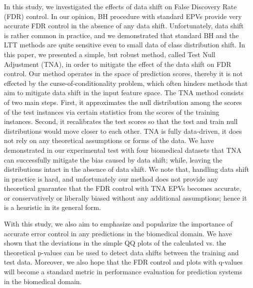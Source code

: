 \documentclass{article}
\newcommand{\todo}[2]{{\color{red} {\bf TODO-#1}: #2}}
\begin{document}
In this study, we investigated the effects of data shift on False Discovery Rate (FDR) control. In our opinion, BH procedure with standard EPVs provide very accurate FDR control in the absence of any data shift. Unfortunately, data shift is rather common in practice, and we demonstrated that standard BH and the LTT methods are quite sensitive even to small data of class distribution shift. In this paper, we presented a simple, but robust method, called Test Null Adjustment (TNA), in order to mitigate the effect of the data shift on FDR control. Our method operates in the space of prediction scores, thereby it is not effected by the curse-of-conditionality problem, which often hinders methods that aim to mitigate data shift in the input feature space. The TNA method consists of two main steps. First, it approximates the null distribution among the scores of the test instances via certain statistics from the scores of the training instances. Second, it recalibrates the test scores so that the test and train null distributions would move closer to each other. TNA is fully data-driven, it does not rely on any theoretical assumptions or forms of the data. We have demonstrated in our experimental test with four biomedical datasets that TNA can successfully mitigate the bias caused by data shift; while, leaving the distributions intact in the absence of data shift. We note that, handling data shift in practice is hard, and unfortunately our method does not provide any theoretical guarantee that the FDR control with TNA EPVs becomes accurate, or conservatively or liberally biased without any additional assumptions; hence it is a heuristic in its general form.  

With this study, we also aim to emphasize and popularize the importance of accurate error control in any predictions in the biomedical domain. We have shown that the deviations in the simple QQ plots of the calculated vs. the theoretical p-values can be used to detect data shifts between the training and test data. Moreover, we also hope that the FDR control and plots with q-values will become a standard metric in performance evaluation for prediction systems in the biomedical domain.




\end{document}
